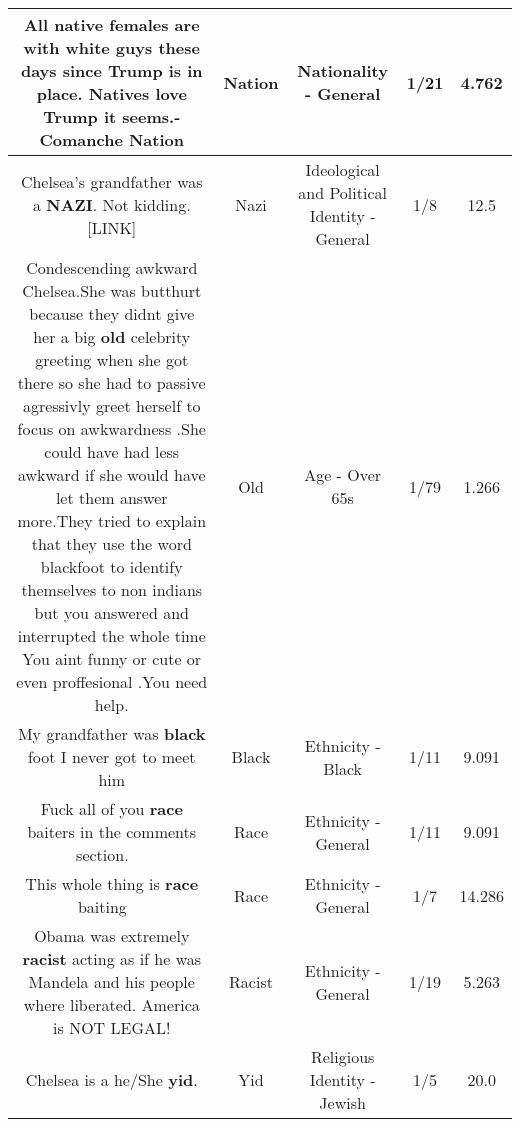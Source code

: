 \documentclass[11pt]{article}
\newlength\mylength
\begin{document}
\begin{center}
\begin{longtable}{|C{.65\mylength}|C{.30\mylength}|C{.12\mylength}|C{.12\mylength}|C{.12\mylength}|}
  \small All native females are with white guys these days since Trump is in place. Natives love Trump it seems.-Comanche Nation\normalsize   & Nation & Nationality - General & 1/21 & 4.762 \\  \hline
  \small Chelsea's grandfather was a \textbf{NAZI}. Not kidding.  [LINK] \normalsize   & Nazi &  Ideological and Political Identity - General & 1/8 & 12.5 \\  \hline
  \small Condescending awkward Chelsea.She was butthurt because they didnt give her a big \textbf{old} celebrity greeting when she got there so she had to passive agressivly greet herself to focus on awkwardness .She could have had less awkward if she would have let them answer more.They tried to explain that they use the word blackfoot to identify themselves to non indians    but you answered and interrupted the whole time  You aint funny or cute or even proffesional .You need help.\normalsize   & Old & Age - Over 65s & 1/79 & 1.266 \\  \hline
  \small My grandfather was \textbf{black} foot I never got to meet him\normalsize   & Black & Ethnicity - Black & 1/11 & 9.091 \\  \hline
  \small Fuck all of you \textbf{race} baiters in the comments section.   🖕😠🖕\normalsize   & Race & Ethnicity - General & 1/11 & 9.091 \\  \hline
  \small This whole thing is \textbf{race} baiting 🖕😠🖕\normalsize   & Race & Ethnicity - General & 1/7 & 14.286 \\  \hline
  \small Obama was extremely \textbf{racist} acting as if he was Mandela and his people where liberated. America is NOT LEGAL!\normalsize   & Racist & Ethnicity - General & 1/19 & 5.263 \\  \hline
  \small Chelsea is a he/She \textbf{yid}.\normalsize   & Yid & Religious Identity - Jewish & 1/5 & 20.0 \\  \hline

\end{longtable}
\end{center}
\end{document}

